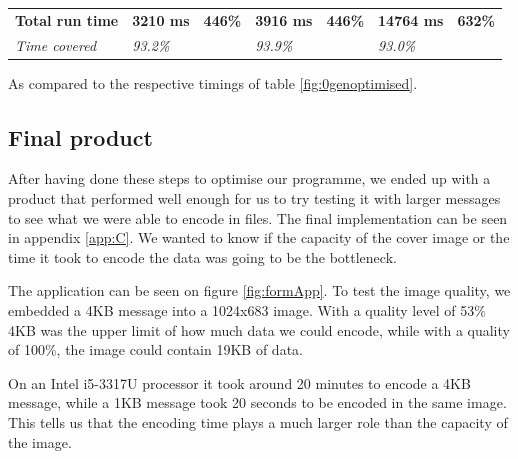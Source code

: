 \begin{table}[H]
\begin{tabular}{@{}lllllll@{}}
        \textbf{Total run time} & \textbf{3210 ms}                                                                          & \textbf{446\%}                                                                 & \textbf{3916 ms}                                                                           & \textbf{446\%}                                                                & \textbf{14764 ms}                                                                       & \textbf{632\%}                                                                \\
        \textit{Time covered}   & \textit{93.2\%}                                                                           & \textit{}                                                                      & \textit{93.9\%}                                                                            &                                                                               & \textit{93.0\%}                                                                         & \textit{}                                                                     \\ \bottomrule
    \end{tabular}
    \begin{tablenotes}
        \footnotesize{\item \textdagger As compared to the respective timings of table \ref{fig:0genoptimised}.}
    \end{tablenotes}
\end{table}

\subsection{Final product}
After having done these steps to optimise our programme, we ended up with a product that performed well enough for us to try testing it with larger messages to see what we were able to encode in files.
The final implementation can be seen in appendix \ref{app:C}.
We wanted to know if the capacity of the cover image or the time it took to encode the data was going to be the bottleneck.

The application can be seen on figure \ref{fig:formApp}.
To test the image quality, we embedded a 4KB message into a 1024x683 image.
With a quality level of 53\% 4KB was the upper limit of how much data we could encode, while with a quality of 100\%, the image could contain 19KB of data.

On an Intel{\textregistered} i5-3317U processor it took around 20 minutes to encode a 4KB message, while a 1KB message took 20 seconds to be encoded in the same image.
This tells us that the encoding time plays a much larger role than the capacity of the image.

